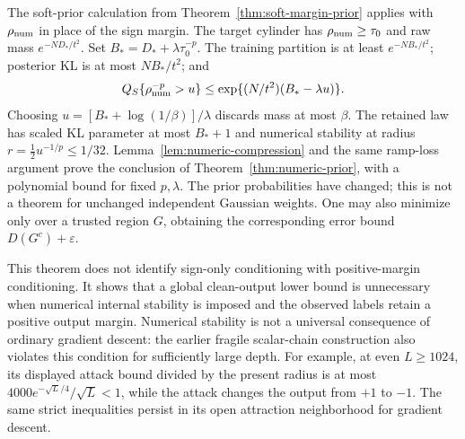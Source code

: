 The soft-prior calculation from Theorem~\ref{thm:soft-margin-prior} applies
with $\rho_{\rm num}$ in place of the sign margin. The target cylinder has
$\rho_{\rm num}\ge\tau_0$ and raw mass $e^{-ND_*/t^2}$.
Set $B_*=D_*+\lambda\tau_0^{-p}$. The training partition is at least
$e^{-NB_*/t^2}$; posterior KL is at most $NB_*/t^2$; and
\[
 Q_S\{\rho_{\rm num}^{-p}>u\}
   \le\exp\{(N/t^2)(B_*-\lambda u)\}.
\]
Choosing $u=[B_*+\log(1/\beta)]/\lambda$ discards mass at most $\beta$.
The retained law has scaled KL parameter at most $B_*+1$ and numerical
stability at radius $r=\tfrac12u^{-1/p}\le1/32$.
Lemma~\ref{lem:numeric-compression} and the same ramp-loss argument prove
the conclusion of Theorem~\ref{thm:numeric-prior}, with a polynomial bound
for fixed $p,\lambda$. The prior probabilities have changed; this is not a
theorem for unchanged independent Gaussian weights.
One may also minimize only over a trusted region $G$, obtaining the
corresponding error bound $D(G^c)+\varepsilon$.

This theorem does not identify sign-only conditioning with positive-margin
conditioning. It shows that a global clean-output lower bound is unnecessary
when numerical internal stability is imposed and the observed labels retain
a positive output margin. Numerical stability is not a universal consequence
of ordinary gradient descent: the earlier fragile scalar-chain construction
also violates this condition for sufficiently large depth. For example, at
even $L\ge1024$, its displayed attack bound divided by the present radius
is at most $4000e^{-\sqrt L/4}/\sqrt L<1$, while the attack changes the output
from $+1$ to $-1$. The same strict inequalities persist in its open attraction
neighborhood for gradient descent.
